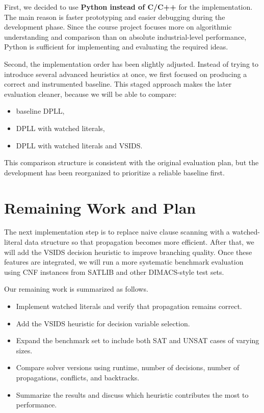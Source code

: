 \documentclass[11pt]{article}
\begin{document}
First, we decided to use \textbf{Python instead of C/C++} for the implementation. The main reason
is faster prototyping and easier debugging during the development phase. Since the course project
focuses more on algorithmic understanding and comparison than on absolute industrial-level
performance, Python is sufficient for implementing and evaluating the required ideas.

Second, the implementation order has been slightly adjusted. Instead of trying to introduce several
advanced heuristics at once, we first focused on producing a correct and instrumented baseline.
This staged approach makes the later evaluation cleaner, because we will be able to compare:

\begin{itemize}
    \item baseline DPLL,
    \item DPLL with watched literals,
    \item DPLL with watched literals and VSIDS.
\end{itemize}

This comparison structure is consistent with the original evaluation plan, but the development has
been reorganized to prioritize a reliable baseline first.

\section{Remaining Work and Plan}

The next implementation step is to replace naive clause scanning with a watched-literal data
structure so that propagation becomes more efficient. After that, we will add the VSIDS decision
heuristic to improve branching quality. Once these features are integrated, we will run a more
systematic benchmark evaluation using CNF instances from SATLIB and other DIMACS-style test
sets.

Our remaining work is summarized as follows.

\begin{itemize}
    \item Implement watched literals and verify that propagation remains correct.
    \item Add the VSIDS heuristic for decision variable selection.
    \item Expand the benchmark set to include both SAT and UNSAT cases of varying sizes.
    \item Compare solver versions using runtime, number of decisions, number of propagations,
    conflicts, and backtracks.
    \item Summarize the results and discuss which heuristic contributes the most to performance.
\end{itemize}
\end{document}

